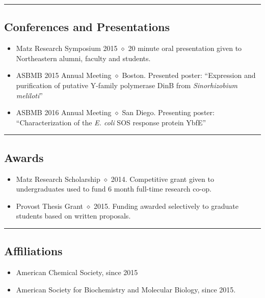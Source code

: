 \documentclass[10pt,letterpaper]{article}
\begin{document}
\hrule
\vspace{-0.4em}
\subsection*{Conferences and Presentations}

\begin{itemize}
  \parskip=0.1em

\item Matz Research Symposium 2015 $\diamond$  20 minute oral presentation given to Northeastern
  alumni, faculty and students.
\item ASBMB 2015 Annual Meeting $\diamond$ Boston.
  Presented poster: ``Expression and purification of
  putative Y-family polymerase DinB from \emph{Sinorhizobium meliloti}''
\item ASBMB 2016 Annual Meeting $\diamond$ San Diego.
  Presenting poster: ``Characterization of the \emph{E. coli} SOS
  response protein YbfE''

\end{itemize}

\hrule
\vspace{-0.4em}
\subsection*{Awards}

\begin{itemize}
  \parskip=0.1em

\item Matz Research Scholarship $\diamond$ 2014. Competitive grant
  given to undergraduates used to fund 6 month full-time research
  co-op.
\item Provost Thesis Grant $\diamond$ 2015. Funding awarded
  selectively to graduate students based on written proposals.

\end{itemize}

\hrule
\vspace{-0.4em}
\subsection*{Affiliations}

\begin{itemize}
  \parskip=0.1em

\item American Chemical Society, since 2015
\item American Society for Biochemistry and Molecular Biology, since
  2015.

\end{itemize}
\end{document}
